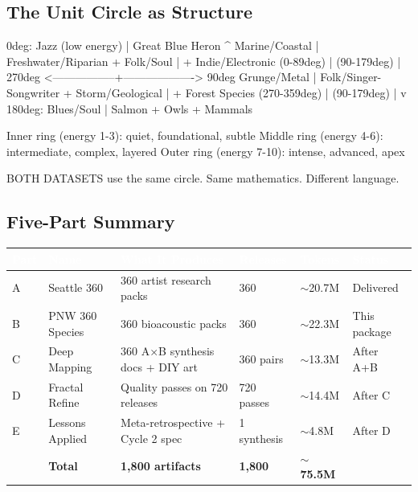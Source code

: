 \documentclass[11pt,letterpaper]{article}
\newcommand{\tblhdr}[1]{\textbf{\sffamily\textcolor{white}{#1}}}
\begin{document}
\subsection{The Unit Circle as Structure}

\begin{asciibox}
                    0deg: Jazz (low energy) | Great Blue Heron
                           ^
         Marine/Coastal    |    Freshwater/Riparian
         + Folk/Soul       |    + Indie/Electronic
         (0-89deg)         |    (90-179deg)
                           |
  270deg <-----------------+-------------------> 90deg
  Grunge/Metal             |             Folk/Singer-Songwriter
  + Storm/Geological       |             + Forest Species
  (270-359deg)             |             (90-179deg)
                           |
                           v
              180deg: Blues/Soul | Salmon + Owls + Mammals

  Inner ring (energy 1-3): quiet, foundational, subtle
  Middle ring (energy 4-6): intermediate, complex, layered  
  Outer ring (energy 7-10): intense, advanced, apex
  
  BOTH DATASETS use the same circle. Same mathematics. Different language.
\end{asciibox}

\subsection{Five-Part Summary}

\begin{center}
\begin{tabularx}{\textwidth}{C{1cm}L{2.5cm}L{3cm}C{2cm}C{2cm}X}
\toprule
{}
\tblhdr{Part} & \tblhdr{Name} & \tblhdr{What It Produces} & \tblhdr{Releases} & \tblhdr{Tokens} & \tblhdr{Status} \\
\midrule
A & Seattle 360 & 360 artist research packs & 360 & $\sim$20.7M & Delivered \\
B & PNW 360 Species & 360 bioacoustic packs & 360 & $\sim$22.3M & This package \\
C & Deep Mapping & 360 A×B synthesis docs + DIY art & 360 pairs & $\sim$13.3M & After A+B \\
D & Fractal Refine & Quality passes on 720 releases & 720 passes & $\sim$14.4M & After C \\
E & Lessons Applied & Meta-retrospective + Cycle 2 spec & 1 synthesis & $\sim$4.8M & After D \\
\midrule
{}
& \textbf{Total} & \textbf{1,800 artifacts} & \textbf{1,800} & \textbf{$\sim$75.5M} & \\
\bottomrule
\end{tabularx}
\end{center}
\end{document}
